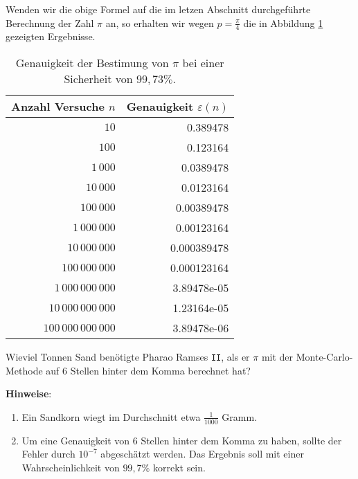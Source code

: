 Wenden wir die obige Formel auf die im letzen Abschnitt durchgef\"uhrte Berechnung der Zahl $\pi$ an, so erhalten
wir wegen $p = \frac{\pi}{4}$ die in Abbildung \ref{tab:Precision.java} gezeigten Ergebnisse.

\begin{table}[htbp]
  \centering
  \begin{tabular}[t]{|r|r|}
\hline
Anzahl Versuche $n$ & Genauigkeit $\varepsilon(n)$ \\
\hline
\hline
                $10$ & 0.389478 \\
\hline
               $100$ & 0.123164 \\
\hline
            $1\,000$ & 0.0389478 \\
\hline
           $10\,000$ & 0.0123164 \\
\hline
          $100\,000$ & 0.00389478 \\
\hline
       $1\,000\,000$ & 0.00123164 \\
\hline
      $10\,000\,000$ & 0.000389478 \\
\hline
     $100\,000\,000$ & 0.000123164 \\
\hline
  $1\,000\,000\,000$ & 3.89478e-05 \\
\hline
 $10\,000\,000\,000$ & 1.23164e-05 \\
\hline
$100\,000\,000\,000$ & 3.89478e-06 \\
\hline

  \end{tabular}
  \caption{Genauigkeit der Bestimung von $\pi$ bei einer Sicherheit von $99,73\%$.}
  \label{tab:Precision.java}
\end{table}

\vspace*{0.3cm}

\exercise
Wieviel Tonnen Sand ben\"otigte Pharao Ramses \texttt{II}, als er $\pi$ mit der Monte-Carlo-Methode auf 6
Stellen hinter dem Komma berechnet hat?
\pagebreak

\noindent
\textbf{Hinweise}: 
\begin{enumerate}
\item Ein Sandkorn wiegt im Durchschnitt etwa $\frac{1}{1000}$ Gramm.
\item Um eine Genauigkeit von 6 Stellen hinter dem Komma zu haben, sollte der Fehler durch $10^{-7}$
      abgesch\"atzt werden.  Das Ergebnis soll mit einer Wahrscheinlichkeit von $99,7\%$ korrekt sein.
\end{enumerate}

